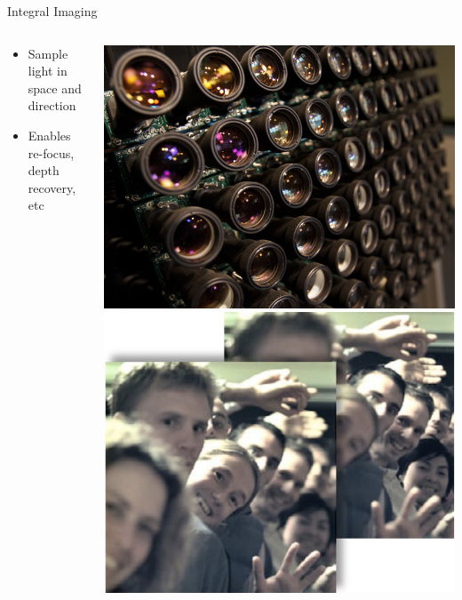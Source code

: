 \documentclass[compress,red,12pt]{beamer}
\begin{document}
\begin{frame}{Integral Imaging}
  \begin{columns}[T]
    \begin{column}{.7\textwidth}
      \begin{itemize}
      \item Sample light in space and direction
      \item Enables re-focus, depth recovery, etc
      \end{itemize}
    \end{column}
    \begin{column}{.3\textwidth}
      \centering
      \includegraphics[height=0.30\textheight]{stanford_camera_array_640x480.jpg}
      \includegraphics[height=0.30\textheight]{lytro.jpg}
    \end{column}
  \end{columns}
\end{frame}
\end{document}
